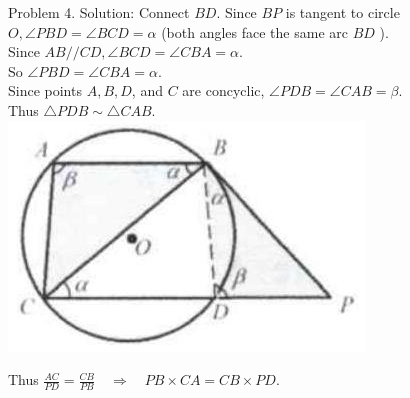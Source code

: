 \documentclass[10pt]{article}
\begin{document}
Problem 4. Solution:
Connect \(B D\). Since \(B P\) is tangent to circle \(O, \angle P B D=\angle B C D=\alpha\) (both angles face the same arc \(B D\) ).\\
Since \(A B / / C D, \angle B C D=\angle C B A=\alpha\).\\
So \(\angle P B D=\angle C B A=\alpha\).\\
Since points \(A, B, D\), and \(C\) are concyclic, \(\angle P D B=\angle C A B=\beta\).\\
Thus \(\triangle P D B \sim \triangle C A B\).\\
\includegraphics[max width=\textwidth, center]{2025_04_17_97bc1f7e44d93c271a88g-172}

Thus \(\frac{A C}{P D}=\frac{C B}{P B} \quad \Rightarrow \quad P B \times C A=C B \times P D\).
\end{document}
